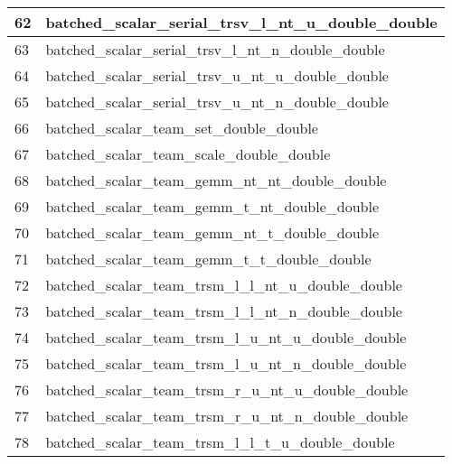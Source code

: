\begin{table}[!htbp]
{\begin{tabular}{|>{\columncolor[HTML]{34FF34}}l |l|}
            \cellcolor[HTML]{FE0000}62 & batched\_scalar\_serial\_trsv\_l\_nt\_u\_double\_double             \\ \hline
            \cellcolor[HTML]{D1B3FF}63 & batched\_scalar\_serial\_trsv\_l\_nt\_n\_double\_double             \\ \hline
            \cellcolor[HTML]{FE0000}64 & batched\_scalar\_serial\_trsv\_u\_nt\_u\_double\_double             \\ \hline
            \cellcolor[HTML]{D1B3FF}65 & batched\_scalar\_serial\_trsv\_u\_nt\_n\_double\_double             \\ \hline
            \cellcolor[HTML]{FE0000}66 & batched\_scalar\_team\_set\_double\_double                          \\ \hline
            67                         & batched\_scalar\_team\_scale\_double\_double                        \\ \hline
            68                         & batched\_scalar\_team\_gemm\_nt\_nt\_double\_double                 \\ \hline
            69                         & batched\_scalar\_team\_gemm\_t\_nt\_double\_double                  \\ \hline
            70                         & batched\_scalar\_team\_gemm\_nt\_t\_double\_double                  \\ \hline
            71                         & batched\_scalar\_team\_gemm\_t\_t\_double\_double                   \\ \hline
            72                         & batched\_scalar\_team\_trsm\_l\_l\_nt\_u\_double\_double            \\ \hline
            \cellcolor[HTML]{D1B3FF}73 & batched\_scalar\_team\_trsm\_l\_l\_nt\_n\_double\_double            \\ \hline
            74                         & batched\_scalar\_team\_trsm\_l\_u\_nt\_u\_double\_double            \\ \hline
            \cellcolor[HTML]{D1B3FF}75 & batched\_scalar\_team\_trsm\_l\_u\_nt\_n\_double\_double            \\ \hline
            76                         & batched\_scalar\_team\_trsm\_r\_u\_nt\_u\_double\_double            \\ \hline
            \cellcolor[HTML]{D1B3FF}77 & batched\_scalar\_team\_trsm\_r\_u\_nt\_n\_double\_double            \\ \hline
            78                         & batched\_scalar\_team\_trsm\_l\_l\_t\_u\_double\_double             \\ \hline

\end{tabular}}
\end{table}

